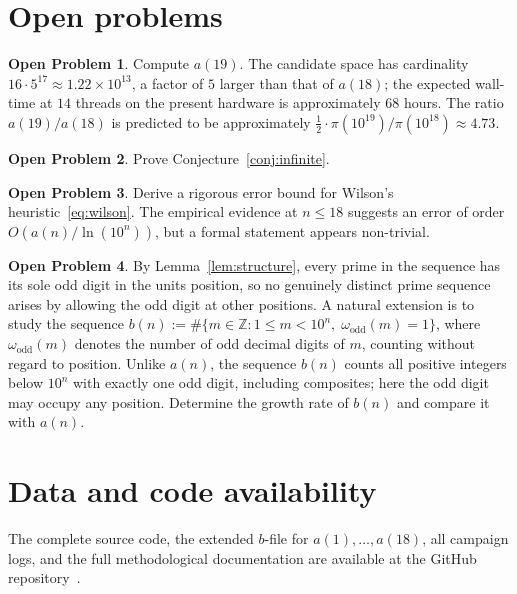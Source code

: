 \documentclass[11pt,a4paper]{article}
\theoremstyle{definition}
\newtheorem{openproblem}{Open Problem}
\begin{document}
\section{Open problems}\label{sec:open}

\begin{openproblem}\label{op:a19}
Compute $a(19)$. The candidate space has cardinality $16 \cdot 5^{17}
\approx 1.22\times 10^{13}$, a factor of $5$ larger than that of $a(18)$;
the expected wall-time at $14$ threads on the present hardware is
approximately $68$ hours. The ratio $a(19)/a(18)$ is predicted to be
approximately $\tfrac{1}{2} \cdot \pi(10^{19})/\pi(10^{18}) \approx 4.73$.
\end{openproblem}

\begin{openproblem}\label{op:proof}
Prove Conjecture~\ref{conj:infinite}.
\end{openproblem}

\begin{openproblem}\label{op:wilson}
Derive a rigorous error bound for Wilson's heuristic~\eqref{eq:wilson}.
The empirical evidence at $n \leq 18$ suggests an error of order
$O(a(n)/\ln(10^n))$, but a formal statement appears non-trivial.
\end{openproblem}

\begin{openproblem}\label{op:digits}
By Lemma~\ref{lem:structure}, every prime in the sequence has its sole odd
digit in the units position, so no genuinely distinct prime sequence arises
by allowing the odd digit at other positions. A natural extension is to
study the sequence $b(n) := \#\{m \in \mathbb{Z} : 1 \le m < 10^n,\;
\omega_{\mathrm{odd}}(m)=1\}$, where $\omega_{\mathrm{odd}}(m)$ denotes
the number of odd decimal digits of $m$, counting without regard to
position. Unlike $a(n)$, the sequence $b(n)$ counts all positive integers
below $10^n$ with exactly one odd digit, including composites; here the odd
digit may occupy any position. Determine the growth rate of $b(n)$ and
compare it with $a(n)$.
\end{openproblem}

\section{Data and code availability}\label{sec:data}

The complete source code, the extended $b$-file for $a(1), \ldots, a(18)$,
all campaign logs, and the full methodological documentation are available
at the GitHub repository~\cite{Repo}.
\end{document}
